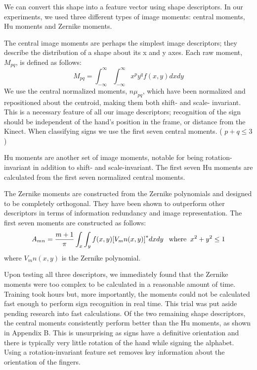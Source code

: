 \documentclass[12pt]{article}
\begin{document}
We can convert this shape into a feature vector using shape descriptors. In our experiments, we used three different types of image moments: central moments, Hu moments and Zernike moments.

The central image moments are perhaps the simplest image descriptors; they describe the distribution of a shape about its x and y axes. Each raw moment, \(M_{pq}\), is defined as follows:
\begin{equation*}
M_{pq} = \int_{-\infty}^\infty \int_{-\infty}^\infty x^p y^q f(x,y) dxdy
\end{equation*}
We use the central normalized moments, \({n\mu}_{pq}\), which have been normalized and repositioned about the centroid, making them both shift- and scale- invariant. This is a necessary feature of all our image descriptors; recognition of the sign should be independent of the hand’s position in the frame, or distance from the Kinect.  When classifying signs we use the first seven central moments. ( \(p+q \leq 3\) )

Hu moments are another set of image moments, notable for being rotation-invariant in addition to shift- and scale-invariant. The first seven Hu moments are calculated from the first seven normalized central moments.

The Zernike moments are constructed from the Zernike polynomials and designed to be completely orthogonal. They have been shown to outperform other descriptors in terms of information redundancy and image representation.  The first seven moments are constructed as follows:
\begin{equation*}
A_{mn} = \frac{m+1}{\pi} \int_x \int_y f(x,y){\left [{V_mn}(x,y) \right ]}^* dxdy \text{\: \:where\: } x^2 + y^2 \leq 1
\end{equation*}
where \({V_mn}(x,y)\) is the Zernike polynomial.

Upon testing all three descriptors, we immediately found that the Zernike moments were too complex to be calculated in a reasonable amount of time. Training took hours but, more importantly, the moments could not be calculated fast enough to perform sign recognition in real time. This trial was put aside pending research into fast calculations. Of the two remaining shape descriptors, the central moments consistently perform better than the Hu moments, as shown in Appendix B. This is unsurprising as signs have a definitive orientation and there is typically very little rotation of the hand while signing the alphabet. Using a rotation-invariant feature set removes key information about the orientation of the fingers. 
\end{document}
